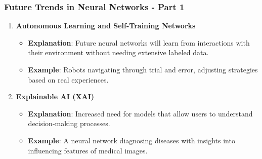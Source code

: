 \documentclass[aspectratio=169]{beamer}
\begin{document}
\begin{frame}[fragile]
    \frametitle{Future Trends in Neural Networks - Part 1}
    \begin{enumerate}
        \item \textbf{Autonomous Learning and Self-Training Networks}
            \begin{itemize}
                \item \textbf{Explanation}: Future neural networks will learn from interactions with their environment without needing extensive labeled data.
                \item \textbf{Example}: Robots navigating through trial and error, adjusting strategies based on real experiences.
            \end{itemize}
        
        \item \textbf{Explainable AI (XAI)}
            \begin{itemize}
                \item \textbf{Explanation}: Increased need for models that allow users to understand decision-making processes.
                \item \textbf{Example}: A neural network diagnosing diseases with insights into influencing features of medical images.
            \end{itemize}
    \end{enumerate}
\end{frame}
\end{document}

